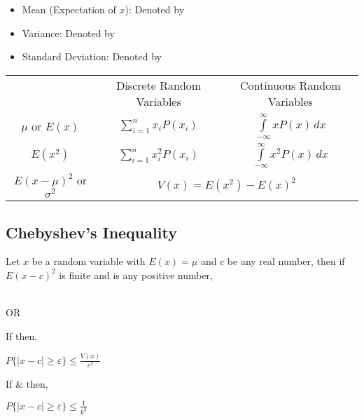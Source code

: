 \documentclass[./EngineeringMaths.tex]{subfiles}
\begin{document}
\begin{itemize}
\item Mean (Expectation of $x$): Denoted by 
\item Variance: Denoted by 
\item Standard Deviation: Denoted by \fbox{$\sigma$}
\end{itemize}
\vspace{1cm}
\begin{center}
{\renewcommand{\arraystretch}{2}
\begin{tabular}{c|c|c|}
\cline{2-3}
& Discrete Random Variables & Continuous Random Variables \\
\cline{2-3}
\multicolumn{1}{c|}{$\mu$ or $E(x)$} & $\sum\limits_{i=1}^n x_i P(x_i)$ &  $\int\limits_{-\infty}^\infty x P(x) \, dx $ \\
\cline{2-3}
\multicolumn{1}{c|}{$E(x^2)$} & $\sum\limits_{i=1}^n x_i^2 P(x_i)$ &  $\int\limits_{-\infty}^\infty x^2 P(x) \, dx $ \\
\cline{2-3}
\multicolumn{1}{c}{$E(x-\mu)^2$ or $\sigma^2$} & \multicolumn{2}{|c|}{$V(x) = E(x^2) - E(x)^2$} \\
\cline{2-3}
\end{tabular}}
\end{center}
\newpage

\subsection{Chebyshev's Inequality}
Let $x$ be a random variable with $E(x) = \mu$ and $c$ be any real number, then if $E(x-c)^2$ is finite and is any positive number,

\begin{center}
 \\ \vspace{0.3cm}
OR \\ \vspace{0.3cm}
\end{center}

If  then,

\begin{center}
    $P\{|x-c|\geq \varepsilon\} \leq \frac{V(x)}{\varepsilon^2}$
\end{center}

If  \&   then,
\begin{center}
    $P\{|x-c|\geq \varepsilon\} \leq \frac{1}{k^2}$
\end{center}
\end{document}
